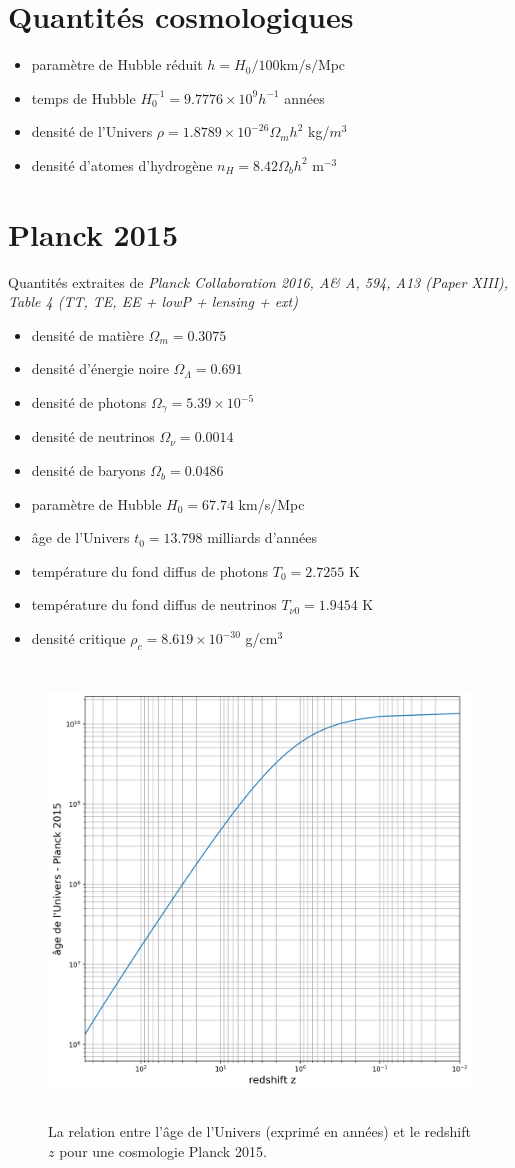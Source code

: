 \section{Quantités cosmologiques}
\begin{itemize}
\item paramètre de Hubble réduit $h=H_0/100\mathrm{km/s/Mpc}$
\item temps de Hubble $H_0^{-1}=9.7776 \times 10^9 h^{-1}$ années
\item densité de l'Univers $\rho=1.8789\times 10^{-26} \Omega_m h^2$ kg/$m^3$
\item densité d'atomes d'hydrogène $n_H=8.42\Omega_b h^2$ m$^{-3}$
\end{itemize}


\section{Planck 2015}
Quantités extraites de \textit{Planck Collaboration 2016, A\& A, 594, A13 (Paper XIII), Table 4 (TT, TE, EE + lowP + lensing + ext)}
\begin{itemize}
\item densité de matière $\Omega_m=0.3075$
\item densité d'énergie noire $\Omega_\Lambda = 0.691$
\item densité de photons $\Omega_\gamma = 5.39 \times 10^{-5}$
\item densité de neutrinos $\Omega_\nu = 0.0014$
\item densité de baryons $\Omega_b=0.0486$
\item paramètre de Hubble $H_0=67.74$ km/s/Mpc
\item âge de l'Univers $t_0=13.798$ milliards d'années
\item température du fond diffus de photons $T_0=2.7255$ K
\item température du fond diffus de neutrinos $T_{\nu0}=1.9454$ K
\item densité critique $\rho_c=8.619\times 10^{-30}$ g/cm$^3$
\end{itemize}

\begin{figure}[htbp]
	\centering
		\includegraphics[height=12cm]{figs/zage.png}
	\caption[La relation redshift-âge pour une cosmologie Planck 2015]{La relation entre l'âge de l'Univers (exprimé en années) et le redshift $z$ pour une cosmologie Planck 2015.}
	\label{f:zage}
\end{figure}

